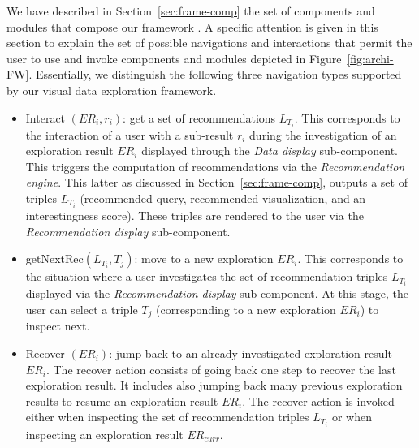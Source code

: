


We have described in Section~\ref{sec:frame-comp} the set of components and modules that compose our framework \framework{}.
A specific attention is given in this section to explain the set of possible navigations and interactions that permit the user to use and invoke components and modules depicted in Figure~\ref{fig:archi-FW}. 
Essentially, we distinguish the following three navigation types supported by our visual data exploration framework.

\begin{itemize}
 \item Interact $(ER_i,r_i)$: get a set of recommendations $L_{T_i}$. This corresponds to the interaction of a user with a sub-result $r_i$ during the investigation of an exploration result $ER_i$ displayed through the \emph{Data display} sub-component. This triggers the computation of recommendations via the \emph{Recommendation engine}.  This latter as discussed in Section~\ref{sec:frame-comp}, outputs a set of triples $L_{T_i}$ (recommended query, recommended visualization, and an interestingness score). These triples are rendered to the user via the \emph{Recommendation display} sub-component.
 
  \item getNextRec$(L_{T_i},T_j)$: move to a new exploration $ER_{i}$. This corresponds to the situation where a user investigates the set of recommendation triples $L_{T_i}$ displayed via the \emph{Recommendation display} sub-component. At this stage, the user can select a triple $T_j$ (corresponding to a new exploration $ER_{i}$) to inspect next.   
  
 \item Recover $(ER_i)$: jump back to an already investigated exploration result $ER_i$. 
  The recover action consists of going back one step to recover the last exploration result. It includes also jumping back many previous exploration results to resume an exploration result $ER_i$. The recover action is invoked either when inspecting the set of recommendation triples $L_{T_i}$ or when inspecting an exploration result $ER_{curr}$.
\end{itemize}   


